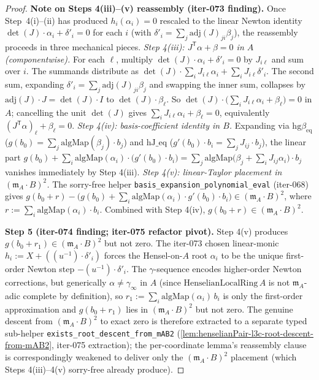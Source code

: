 \begin{proof}
\medskip\noindent\textbf{Note on Steps 4(iii)–(v) reassembly
(iter-073 finding).}
Once Step~4(i)–(ii) has produced $h_i(\alpha_i) = 0$ rescaled
to the linear Newton identity $\det(J)\cdot\alpha_i + \delta'_i
= 0$ for each $i$ (with $\delta'_i = \sum_j \mathrm{adj}(J)_{ji}
\beta_j$), the reassembly proceeds in three mechanical pieces.
\emph{Step 4(iii): $J^{\mathsf T}\alpha + \beta = 0$ in $A$
(componentwise).} For each $\ell$, multiply
$\det(J)\cdot\alpha_i + \delta'_i = 0$ by $J_{i\ell}$ and sum
over $i$. The summands distribute as $\det(J) \cdot \sum_i
J_{i\ell}\alpha_i + \sum_i J_{i\ell}\delta'_i$. The second
sum, expanding $\delta'_i = \sum_j \mathrm{adj}(J)_{ji}\beta_j$
and swapping the inner sum, collapses by $\mathrm{adj}(J)\cdot J
= \det(J)\cdot I$ to $\det(J)\cdot \beta_\ell$. So $\det(J)
\cdot \bigl(\sum_i J_{i\ell}\alpha_i + \beta_\ell\bigr) = 0$ in
$A$; cancelling the unit $\det(J)$ gives $\sum_i J_{i\ell}
\alpha_i + \beta_\ell = 0$, equivalently $(J^{\mathsf T}
\alpha)_\ell + \beta_\ell = 0$. \emph{Step 4(iv):
basis-coefficient identity in $B$.} Expanding via $\mathrm{hg}
\beta_\mathrm{eq}$ ($g(b_0) = \sum_j \mathrm{algMap}(\beta_j)
\cdot b_j$) and $\mathrm{hJ\_eq}$ ($g'(b_0) \cdot b_i = \sum_j
J_{ij} \cdot b_j$), the linear part
$g(b_0) + \sum_i \mathrm{algMap}(\alpha_i) \cdot
\bigl(g'(b_0) \cdot b_i\bigr) = \sum_j \mathrm{algMap}\bigl(
\beta_j + \sum_i J_{ij}\alpha_i\bigr) \cdot b_j$ vanishes
immediately by Step 4(iii). \emph{Step 4(v):
linear-Taylor placement in $(\mathfrak m_A \cdot B)^2$.} The
sorry-free helper \texttt{basis\_expansion\_polynomial\_eval}
(iter-068) gives
$g(b_0 + r) - \bigl(g(b_0) + \sum_i \mathrm{algMap}(\alpha_i)
\cdot g'(b_0) \cdot b_i\bigr) \in (\mathfrak m_A \cdot B)^2$,
where $r := \sum_i \mathrm{algMap}(\alpha_i) \cdot b_i$.
Combined with Step 4(iv), $g(b_0 + r) \in (\mathfrak m_A
\cdot B)^2$.

\medskip\noindent\textbf{Step 5 (iter-074 finding; iter-075
refactor pivot).} Step 4(v) produces $g(b_0 + r_1) \in
(\mathfrak m_A \cdot B)^2$ but not zero. The iter-073 chosen
linear-monic $h_i := X + ((u^{-1}) \cdot \delta'_i)$ forces
the Hensel-on-$A$ root $\alpha_i$ to be the unique first-order
Newton step $-(u^{-1}) \cdot \delta'_i$. The $\gamma$-sequence
encodes higher-order Newton corrections, but generically
$\alpha \ne \gamma_\infty$ in $A$ (since
$\mathrm{HenselianLocalRing}\,A$ is not $\mathfrak m_A$-adic
complete by definition), so $r_1 := \sum_i
\mathrm{algMap}(\alpha_i)\,b_i$ is only the first-order
approximation and $g(b_0 + r_1)$ lies in $(\mathfrak m_A
\cdot B)^2$ but not zero. The genuine descent from
$(\mathfrak m_A \cdot B)^2$ to exact zero is therefore extracted
to a separate typed sub-helper
\texttt{exists\_root\_descent\_from\_mAB2}
(\cref{lem:henselianPair-l3c-root-descent-from-mAB2}, iter-075
extraction); the per-coordinate lemma's reassembly clause is
correspondingly weakened to deliver only the
$(\mathfrak m_A \cdot B)^2$ placement (which Steps 4(iii)–4(v)
sorry-free already produce).
\end{proof}

